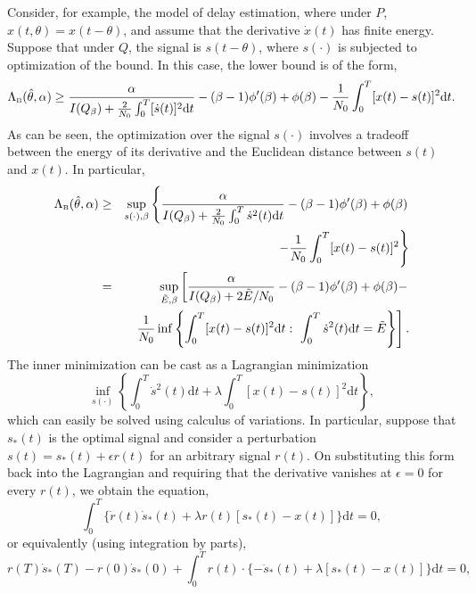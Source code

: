 \documentclass[11pt,epsf]{article}
\newcommand{\ct}{\hat{\theta}}
\begin{document}
Consider, for example, the model of delay estimation, 
where under $P$, $x(t,\theta)=x(t-\theta)$, and assume that the derivative
$\dot{x}(t)$ has
finite energy. Suppose that under $Q$, the signal is $s(t-\theta)$, where 
$s(\cdot)$ is subjected to optimization of the bound.
In this case, the lower bound is of the form,
\begin{equation}
\Lambda_{\mbox{\tiny B}}(\ct,\alpha)
\ge\frac{\alpha}
{I(Q_\beta)+\frac{2}{N_0}\int_0^T[\dot{s}(t)]^2
\mbox{d}t}-
(\beta-1)\phi^\prime(\beta)+\phi(\beta)-
\frac{1}{N_0}\int_0^T[x(t)-s(t)]^2\mbox{d}t.
\end{equation}
As can be seen,
the optimization over the signal $s(\cdot)$ involves a tradeoff between
the energy of its derivative and the Euclidean distance between $s(t)$ and $x(t)$.
In particular,
\begin{eqnarray}
\Lambda_{\mbox{\tiny B}}(\ct,\alpha)&\ge&
\sup_{s(\cdot),\beta}\left\{\frac{\alpha}
{I(Q_\beta)+\frac{2}{N_0}\int_0^T\dot{s}^2(t)
\mbox{d}t}
-(\beta-1)\phi^\prime(\beta)+\phi(\beta)\right.\nonumber\\
& &\left.-\frac{1}{N_0}\int_0^T[x(t)-s(t)]^2\right\}\nonumber\\
&=&\sup_{\tilde{E},\beta}\left[\frac{\alpha}
{I(Q_\beta)+2\tilde{E}/N_0}
-(\beta-1)\phi^\prime(\beta)+\phi(\beta)-\right.\nonumber\\
& &\left.\frac{1}{N_0}\inf
\left\{\int_0^T[x(t)-s(t)]^2\mbox{d}t:~\int_0^T\dot{s}^2(t)\mbox{d}t=
\tilde{E}\right\}\right].
\end{eqnarray}
The inner minimization can be cast as a Lagrangian minimization
\begin{equation}
\inf_{s(\cdot)}\left\{\int_0^T\dot{s}^2(t)\mbox{d}t+\lambda
\int_0^T[x(t)-s(t)]^2\mbox{d}t\right\},
\end{equation}
which can easily be solved using calculus of variations.
In particular, suppose that $s_*(t)$ is the optimal signal and consider
a perturbation $s(t)=s_*(t)+\epsilon r(t)$ for an arbitrary signal $r(t)$.
On substituting this form back into the Lagrangian and requiring
that the derivative vanishes at $\epsilon=0$ for every $r(t)$, we obtain the
equation,
\begin{equation} 
\int_0^T\{\dot{r}(t)\dot{s}_*(t)+\lambda r(t)[s_*(t)-x(t)]\}\mbox{d}t=0,
\end{equation}
or equivalently (using integration by parts),
\begin{equation} 
r(T)\dot{s}_*(T)-r(0)\dot{s}_*(0)+\int_0^Tr(t)\cdot\{-\ddot{s}_*(t)+\lambda[s_*(t)-x(t)]\}\mbox{d}t=0,
\end{equation}
\end{document}
